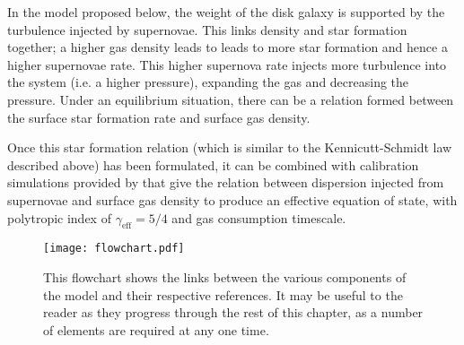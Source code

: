 In the model proposed below, the weight of the disk galaxy is supported by the turbulence injected by supernovae.
This links density and star formation together; a higher gas density leads to leads to more star formation and hence a higher supernovae rate.
This higher supernova rate injects more turbulence into the system (i.e. a higher pressure), expanding the gas and decreasing the pressure.
Under an equilibrium situation, there can be a relation formed between the surface star formation rate and surface gas density.

Once this star formation relation (which is similar to the Kennicutt-Schmidt law described above) has been formulated, it can be combined with calibration simulations provided by \citet{martizzi_supernova_2015} that give the relation between dispersion injected from supernovae and surface gas density to produce an effective equation of state, with polytropic index of $\gamma_\mathrm{eff} = 5/4$ and gas consumption timescale.

\begin{figure}[!ht]
    \centering
    \texttt{[image: flowchart.pdf]}
    \caption{This flowchart shows the links between the various components of the model and their respective references.
    It may be useful to the reader as they progress through the rest of this chapter, as a number of elements are required at any one time.}
    \label{fig:flowchart}
\end{figure}
